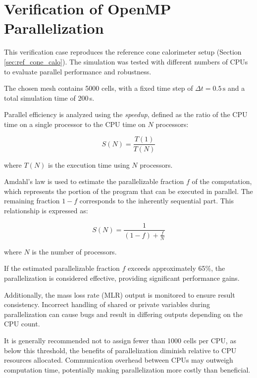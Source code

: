 \documentclass[12pt]{article}
\begin{document}
\fi

\section{Verification of OpenMP Parallelization}

This verification case reproduces the reference cone calorimeter setup (Section \ref{sec:ref_cone_calo}). The simulation was tested with different numbers of CPUs to evaluate parallel performance and robustness.

The chosen mesh contains 5000 cells, with a fixed time step of \(\Delta t = 0.5\,\mathrm{s}\) and a total simulation time of 200\,s.

Parallel efficiency is analyzed using the \textit{speedup}, defined as the ratio of the CPU time on a single processor to the CPU time on \(N\) processors:

\begin{equation}
S(N) = \frac{T(1)}{T(N)}
\label{eq:speedup}
\end{equation}

where \(T(N)\) is the execution time using \(N\) processors.

Amdahl's law is used to estimate the parallelizable fraction \(f\) of the computation, which represents the portion of the program that can be executed in parallel. The remaining fraction \(1-f\) corresponds to the inherently sequential part. This relationship is expressed as:

\begin{equation}
S(N) = \frac{1}{(1-f) + \frac{f}{N}}
\label{eq:amdahl}
\end{equation}

where \(N\) is the number of processors.

If the estimated parallelizable fraction \(f\) exceeds approximately 65\%, the parallelization is considered effective, providing significant performance gains.

Additionally, the mass loss rate (MLR) output is monitored to ensure result consistency. Incorrect handling of shared or private variables during parallelization can cause bugs and result in differing outputs depending on the CPU count.

It is generally recommended not to assign fewer than 1000 cells per CPU, as below this threshold, the benefits of parallelization diminish relative to CPU resources allocated. Communication overhead between CPUs may outweigh computation time, potentially making parallelization more costly than beneficial.
\end{document}
